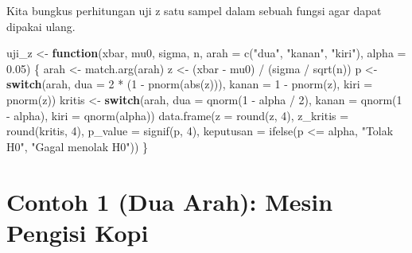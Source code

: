 \documentclass[
  indonesian,
  letterpaper,
]{book}
\newenvironment{Shaded}{\begin{snugshade}}{\end{snugshade}}
\newcommand{\AttributeTok}[1]{\textcolor[rgb]{0.40,0.45,0.13}{#1}}
\newcommand{\ControlFlowTok}[1]{\textcolor[rgb]{0.00,0.23,0.31}{\textbf{#1}}}
\newcommand{\DecValTok}[1]{\textcolor[rgb]{0.68,0.00,0.00}{#1}}
\newcommand{\FloatTok}[1]{\textcolor[rgb]{0.68,0.00,0.00}{#1}}
\newcommand{\FunctionTok}[1]{\textcolor[rgb]{0.28,0.35,0.67}{#1}}
\newcommand{\NormalTok}[1]{\textcolor[rgb]{0.00,0.23,0.31}{#1}}
\newcommand{\OtherTok}[1]{\textcolor[rgb]{0.00,0.23,0.31}{#1}}
\newcommand{\SpecialCharTok}[1]{\textcolor[rgb]{0.37,0.37,0.37}{#1}}
\newcommand{\StringTok}[1]{\textcolor[rgb]{0.13,0.47,0.30}{#1}}
\begin{document}
Kita bungkus perhitungan uji z satu sampel dalam sebuah fungsi agar
dapat dipakai ulang.

\begin{Shaded}
\begin{Highlighting}[]
\NormalTok{uji\_z }\OtherTok{\textless{}{-}} \ControlFlowTok{function}\NormalTok{(xbar, mu0, sigma, n, }\AttributeTok{arah =} \FunctionTok{c}\NormalTok{(}\StringTok{"dua"}\NormalTok{, }\StringTok{"kanan"}\NormalTok{, }\StringTok{"kiri"}\NormalTok{), }\AttributeTok{alpha =} \FloatTok{0.05}\NormalTok{) \{}
\NormalTok{  arah }\OtherTok{\textless{}{-}} \FunctionTok{match.arg}\NormalTok{(arah)}
\NormalTok{  z }\OtherTok{\textless{}{-}}\NormalTok{ (xbar }\SpecialCharTok{{-}}\NormalTok{ mu0) }\SpecialCharTok{/}\NormalTok{ (sigma }\SpecialCharTok{/} \FunctionTok{sqrt}\NormalTok{(n))}
\NormalTok{  p }\OtherTok{\textless{}{-}} \ControlFlowTok{switch}\NormalTok{(arah, }\AttributeTok{dua =} \DecValTok{2} \SpecialCharTok{*}\NormalTok{ (}\DecValTok{1} \SpecialCharTok{{-}} \FunctionTok{pnorm}\NormalTok{(}\FunctionTok{abs}\NormalTok{(z))), }\AttributeTok{kanan =} \DecValTok{1} \SpecialCharTok{{-}} \FunctionTok{pnorm}\NormalTok{(z), }\AttributeTok{kiri =} \FunctionTok{pnorm}\NormalTok{(z))}
\NormalTok{  kritis }\OtherTok{\textless{}{-}} \ControlFlowTok{switch}\NormalTok{(arah, }\AttributeTok{dua =} \FunctionTok{qnorm}\NormalTok{(}\DecValTok{1} \SpecialCharTok{{-}}\NormalTok{ alpha }\SpecialCharTok{/} \DecValTok{2}\NormalTok{), }\AttributeTok{kanan =} \FunctionTok{qnorm}\NormalTok{(}\DecValTok{1} \SpecialCharTok{{-}}\NormalTok{ alpha), }\AttributeTok{kiri =} \FunctionTok{qnorm}\NormalTok{(alpha))}
  \FunctionTok{data.frame}\NormalTok{(}\AttributeTok{z =} \FunctionTok{round}\NormalTok{(z, }\DecValTok{4}\NormalTok{), }\AttributeTok{z\_kritis =} \FunctionTok{round}\NormalTok{(kritis, }\DecValTok{4}\NormalTok{), }\AttributeTok{p\_value =} \FunctionTok{signif}\NormalTok{(p, }\DecValTok{4}\NormalTok{),}
             \AttributeTok{keputusan =} \FunctionTok{ifelse}\NormalTok{(p }\SpecialCharTok{\textless{}=}\NormalTok{ alpha, }\StringTok{"Tolak H0"}\NormalTok{, }\StringTok{"Gagal menolak H0"}\NormalTok{))}
\NormalTok{\}}
\end{Highlighting}
\end{Shaded}

\section{Contoh 1 (Dua Arah): Mesin Pengisi
Kopi}\label{contoh-1-dua-arah-mesin-pengisi-kopi}
\end{document}
